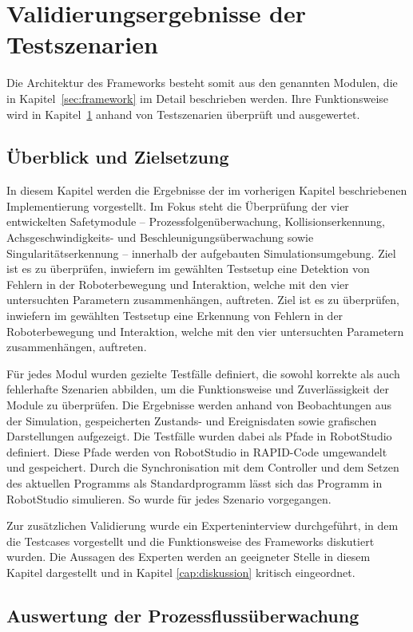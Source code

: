 \chapter{Validierungsergebnisse der Testszenarien}
\label{cap:Ergebnisse}
Die Architektur des Frameworks besteht somit aus den genannten Modulen, die in
Kapitel~\ref{sec:framework} im Detail beschrieben werden. Ihre
Funktionsweise wird in
Kapitel~\ref{cap:Ergebnisse} anhand von Testszenarien überprüft und ausgewertet.
\section{Überblick und Zielsetzung}

In diesem Kapitel werden die Ergebnisse der im vorherigen Kapitel beschriebenen
Implementierung vorgestellt. Im Fokus steht die Überprüfung der vier
entwickelten Safetymodule – Prozessfolgenüberwachung, Kollisionserkennung,
Achsgeschwindigkeits- und Beschleunigungsüberwachung sowie
Singularitätserkennung – innerhalb der aufgebauten Simulationsumgebung. Ziel ist
es zu überprüfen, inwiefern im gewählten Testsetup eine Detektion von Fehlern in
der Roboterbewegung und Interaktion, welche mit den vier untersuchten Parametern
zusammenhängen, auftreten. Ziel ist es zu überprüfen, inwiefern im gewählten
Testsetup eine Erkennung von Fehlern in der Roboterbewegung und Interaktion,
welche mit den vier untersuchten Parametern zusammenhängen, auftreten.

Für jedes Modul wurden gezielte Testfälle definiert, die sowohl korrekte als
auch fehlerhafte Szenarien abbilden, um die Funktionsweise und Zuverlässigkeit
der Module zu überprüfen. Die Ergebnisse werden anhand von Beobachtungen aus der
Simulation, gespeicherten Zustands- und Ereignisdaten sowie grafischen
Darstellungen aufgezeigt. Die Testfälle wurden dabei als Pfade in RobotStudio
definiert. Diese Pfade werden von RobotStudio in RAPID-Code umgewandelt und
gespeichert. Durch die Synchronisation mit dem Controller und dem Setzen des
aktuellen Programms als Standardprogramm lässt sich das Programm in RobotStudio
simulieren. So wurde für jedes Szenario vorgegangen.

Zur zusätzlichen Validierung wurde ein Experteninterview durchgeführt, in dem
die Testcases vorgestellt und die Funktionsweise des Frameworks diskutiert
wurden. Die Aussagen des Experten werden an geeigneter Stelle in diesem Kapitel
dargestellt und in Kapitel \ref{cap:diskussion} kritisch eingeordnet.

\section{Auswertung der Prozessflussüberwachung}
\label{sec:processauswertung}

